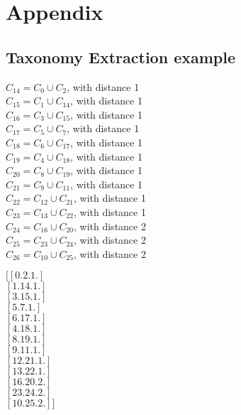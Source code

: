 \chapter{Appendix}

\section{Taxonomy Extraction example}
\begin{minipage}{0.4\textwidth}
$C_{14} = C_0 \cup C_2$, with distance 1 \\
$C_{15} = C_1 \cup C_14$, with distance 1 \\
$C_{16} = C_3 \cup C_15$, with distance 1 \\
$C_{17} = C_5 \cup C_7$, with distance 1 \\
$C_{18} = C_6 \cup C_17$, with distance 1 \\
$C_{19} = C_4 \cup C_18$, with distance 1 \\
$C_{20} = C_8 \cup C_19$, with distance 1 \\
$C_{21} = C_9 \cup C_11$, with distance 1 \\
$C_{22} = C_12 \cup C_21$, with distance 1 \\
$C_{23} = C_13 \cup C_22$, with distance 1 \\
$C_{24} = C_16 \cup C_20$, with distance 2 \\
$C_{25} = C_23 \cup C_24$, with distance 2 \\
$C_{26} = C_10 \cup C_25$, with distance 2 \\
\end{minipage} \hfill
\begin{minipage}{0.4\textwidth}
$[[ 0.  2.  1.]$ \\
 $[ 1. 14.  1.]$\\
 $[ 3. 15.  1.]$\\
 $[ 5.  7.  1.]$\\
 $[ 6. 17.  1.]$\\
 $[ 4. 18.  1.]$\\
 $[ 8. 19.  1.]$\\
 $[ 9. 11.  1.]$\\
 $[12. 21.  1.]$\\
 $[13. 22.  1.]$\\
 $[16. 20.  2.]$\\
 $[23. 24.  2.]$\\
 $[10. 25.  2.]]$ \\
\end{minipage} \\


